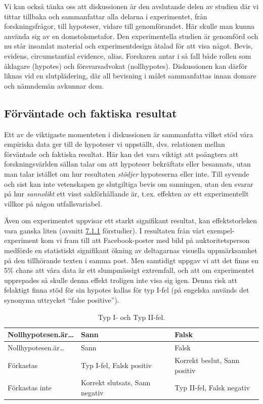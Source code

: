 \documentclass[
]{book}
\begin{document}
Vi kan också tänka oss att diskussionen är den avslutande delen av studien där vi tittar tillbaka och sammanfattar alla delarna i experimentet, från forskningsfrågor, till hypoteser, vidare till genomförandet. Här skulle man kunna använda sig av en domstolsmetafor. Den experimentella studien är genomförd och nu står insamlat material och experimentdesign åtalad för att visa något. Bevis, evidens, circumstantial evidence, alias. Forskaren antar i så fall både rollen som åklagare (hypotes) och försvarsadvokat (nollhypotes). Diskussionen kan därför liknas vid en slutplädering, där all bevisning i målet sammanfattas innan domare och nämndemän avkunnar dom.

\hypertarget{sub08.2.1}{%
\subsection{Förväntade och faktiska resultat}\label{sub08.2.1}}

Ett av de viktigaste momenteten i diskussionen är sammanfatta vilket stöd våra empiriska data ger till de hypoteser vi uppställt, dvs. relationen mellan förväntade och faktiska resultat. Här kan det vara viktigt att poängtera att forskningsvärlden sällan talar om att hypoteser bekräftats eller besannats, utan man talar istället om hur resultaten \emph{stödjer} hypoteserna eller inte. Till syvende och sist kan inte vetenskapen ge slutgiltiga bevis om sanningen, utan den svarar på hur \emph{sannolikt} ett visst sakförhållande är, t.ex. effekten av ett experimentellt villkor på någon utfallsvariabel.

Även om experimentet uppvisar ett starkt signifikant resultat, kan effektstorleken vara ganska liten (avsnitt \protect\hyperlink{sub07.1.1}{7.1.1} förstudier). I resultaten från vårt exempel-experiment kom vi fram till att Facebook-poster med bild på auktoritetsperson medförde en statistiskt signifikant ökning av deltagarnas visuella uppmärksamhet på den tillhörande texten i samma post. Men samtidigt uppgav vi att det finns en 5\% chans att våra data är ett slumpmässigt extremfall, och att om experimentet upprepades så skulle denna effekt troligen inte visa sig igen. Denna risk att felaktigt finna stöd för sin hypotes kallas för typ I-fel (på engelska används det synonyma uttrycket ``false positive'').

\begin{longtable}[]{@{}lll@{}}
\caption{\label{tab:tab-02-08-2-1-01}Typ I- och Typ II-fel.}\tabularnewline
\toprule
Nollhypotesen.är\ldots{} & Sann & Falsk\tabularnewline
\midrule
\endfirsthead
\toprule
Nollhypotesen.är\ldots{} & Sann & Falsk\tabularnewline
\midrule
\endhead
Förkastas & Typ I-fel, Falsk positiv & Korrekt beslut, Sann positiv\tabularnewline
Förkastas inte & Korrekt slutsats, Sann negativ & Typ II-fel, Falsk negativ\tabularnewline
\bottomrule
\end{longtable}
\end{document}
